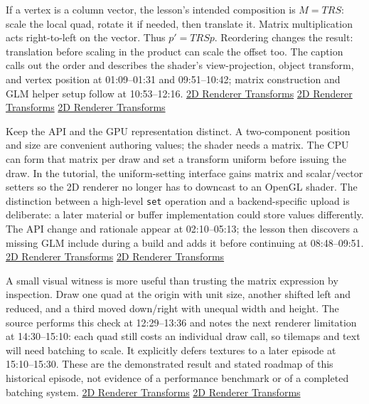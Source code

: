 If a vertex is a column vector, the lesson's intended composition is \(M=TRS\): scale the local quad, rotate it if needed, then translate it. Matrix multiplication acts right-to-left on the vector. Thus \(p'=TRSp\). Reordering changes the result: translation before scaling in the product can scale the offset too. The caption calls out the order and describes the shader's view-projection, object transform, and vertex position at 01:09--01:31 and 09:51--10:42; matrix construction and GLM helper setup follow at 10:53--12:16. \href{https://www.youtube.com/watch?v=-Qt12lcAF0Y&t=69s}{2D Renderer Transforms} \href{https://www.youtube.com/watch?v=-Qt12lcAF0Y&t=591s}{2D Renderer Transforms} \href{https://www.youtube.com/watch?v=-Qt12lcAF0Y&t=653s}{2D Renderer Transforms}

Keep the API and the GPU representation distinct. A two-component position and size are convenient authoring values; the shader needs a matrix. The CPU can form that matrix per draw and set a transform uniform before issuing the draw. In the tutorial, the uniform-setting interface gains matrix and scalar/vector setters so the 2D renderer no longer has to downcast to an OpenGL shader. The distinction between a high-level \texttt{set} operation and a backend-specific upload is deliberate: a later material or buffer implementation could store values differently. The API change and rationale appear at 02:10--05:13; the lesson then discovers a missing GLM include during a build and adds it before continuing at 08:48--09:51. \href{https://www.youtube.com/watch?v=-Qt12lcAF0Y&t=130s}{2D Renderer Transforms} \href{https://www.youtube.com/watch?v=-Qt12lcAF0Y&t=528s}{2D Renderer Transforms}

A small visual witness is more useful than trusting the matrix expression by inspection. Draw one quad at the origin with unit size, another shifted left and reduced, and a third moved down/right with unequal width and height. The source performs this check at 12:29--13:36 and notes the next renderer limitation at 14:30--15:10: each quad still costs an individual draw call, so tilemaps and text will need batching to scale. It explicitly defers textures to a later episode at 15:10--15:30. These are the demonstrated result and stated roadmap of this historical episode, not evidence of a performance benchmark or of a completed batching system. \href{https://www.youtube.com/watch?v=-Qt12lcAF0Y&t=749s}{2D Renderer Transforms} \href{https://www.youtube.com/watch?v=-Qt12lcAF0Y&t=870s}{2D Renderer Transforms}

